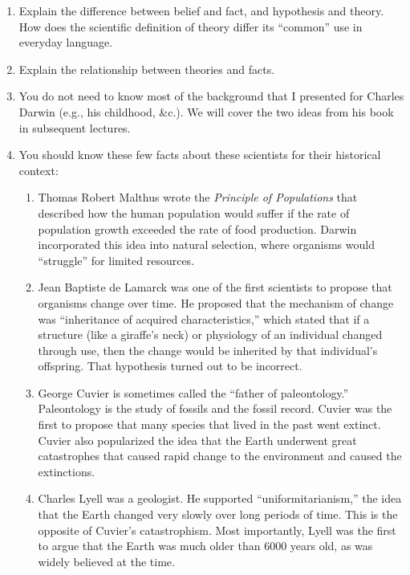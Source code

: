 \documentclass[letterpaper]{tufte-handout}
\begin{document}
\begin{enumerate}

	\item Explain the difference between belief and fact, and hypothesis and theory. How does the scientific definition of theory differ its “common” use in everyday language.

	\item Explain the relationship between theories and facts.
	
	\item You do not need to know most of the background that I presented for Charles Darwin (e.g., his childhood, \&c.). We will cover the two ideas from his book in subsequent lectures.
	
	\item You should know these few facts about these scientists for their historical context:

	\begin{enumerate}[label=\alph*.]

	\item Thomas Robert Malthus wrote the \textit{Principle of Populations} that described how the human population would suffer if the rate of population growth exceeded the rate of food production. Darwin incorporated this idea into natural selection, where organisms would “struggle” for limited resources. 
	
	\item Jean Baptiste de Lamarck was one of the first scientists to propose that organisms change over time. He proposed that the mechanism of change was “inheritance of acquired characteristics,” which stated that if a structure (like a giraffe's neck) or physiology of an individual changed through use, then the change would be inherited by that individual's offspring. That hypothesis turned out to be incorrect.

	\item George Cuvier is sometimes called the “father of paleontology.” Paleontology is the study of fossils and the fossil record. Cuvier was the first to propose that many species that lived in the past went extinct. Cuvier also popularized the idea that the Earth underwent great catastrophes that caused rapid change to the environment and caused the extinctions.

	\item Charles Lyell was a geologist. He supported ``uniformitarianism,'' the idea that the Earth changed very slowly over long periods of time. This is the opposite of Cuvier's catastrophism. Most importantly, Lyell was the first to argue that the Earth was much older than 6000 years old, as was widely believed at the time.


\end{enumerate}
\end{enumerate}
\end{document}
